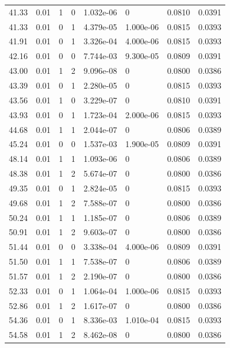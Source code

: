 \documentclass[preview]{standalone}
\begin{document}
{{{\begin{tabular}{L{1.2cm}C{1.2cm} C{0.3cm}C{0.5cm} C{1.4cm}C{1.4cm} C{1.4cm}C{1.4cm}}
  41.33  &  0.01  & 1     &  0 &  1.032e-06  & 0  & 0.0810 &  0.0391   \\ 
  41.33  &  0.01  & 0     &  1 &  4.379e-05  & 1.000e-06  & 0.0815 &  0.0393   \\ 
  41.91  &  0.01  & 0     &  1 &  3.326e-04  & 4.000e-06  & 0.0815 &  0.0393   \\ 
  42.16  &  0.01  & 0     &  0 &  7.744e-03  & 9.300e-05  & 0.0809 &  0.0391   \\ 
  43.00  &  0.01  & 1     &  2 &  9.096e-08  & 0  & 0.0800 &  0.0386   \\ 
  43.39  &  0.01  & 0     &  1 &  2.280e-05  & 0  & 0.0815 &  0.0393   \\ 
  43.56  &  0.01  & 1     &  0 &  3.229e-07  & 0  & 0.0810 &  0.0391   \\ 
  43.93  &  0.01  & 0     &  1 &  1.723e-04  & 2.000e-06  & 0.0815 &  0.0393   \\ 
  44.68  &  0.01  & 1     &  1 &  2.044e-07  & 0  & 0.0806 &  0.0389   \\ 
  45.24  &  0.01  & 0     &  0 &  1.537e-03  & 1.900e-05  & 0.0809 &  0.0391   \\ 
  48.14  &  0.01  & 1     &  1 &  1.093e-06  & 0  & 0.0806 &  0.0389   \\ 
  48.38  &  0.01  & 1     &  2 &  5.674e-07  & 0  & 0.0800 &  0.0386   \\ 
  49.35  &  0.01  & 0     &  1 &  2.824e-05  & 0  & 0.0815 &  0.0393   \\ 
  49.68  &  0.01  & 1     &  2 &  7.588e-07  & 0  & 0.0800 &  0.0386   \\ 
  50.24  &  0.01  & 1     &  1 &  1.185e-07  & 0  & 0.0806 &  0.0389   \\ 
  50.91  &  0.01  & 1     &  2 &  9.603e-07  & 0  & 0.0800 &  0.0386   \\ 
  51.44  &  0.01  & 0     &  0 &  3.338e-04  & 4.000e-06  & 0.0809 &  0.0391   \\ 
  51.50  &  0.01  & 1     &  1 &  7.538e-07  & 0  & 0.0806 &  0.0389   \\ 
  51.57  &  0.01  & 1     &  2 &  2.190e-07  & 0  & 0.0800 &  0.0386   \\ 
  52.33  &  0.01  & 0     &  1 &  1.064e-04  & 1.000e-06  & 0.0815 &  0.0393   \\ 
  52.86  &  0.01  & 1     &  2 &  1.617e-07  & 0  & 0.0800 &  0.0386   \\ 
  54.36  &  0.01  & 0     &  1 &  8.336e-03  & 1.010e-04  & 0.0815 &  0.0393   \\ 
  54.58  &  0.01  & 1     &  2 &  8.462e-08  & 0  & 0.0800 &  0.0386   \\ 

\end{tabular}}}}
\end{document}
